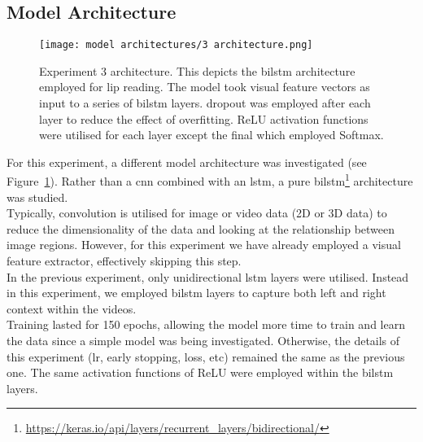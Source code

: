 \subsection{Model Architecture}
\begin{figure}
\centering
\texttt{[image: model architectures/3 architecture.png]}
\caption[Experiment 3 architecture]{Experiment 3 architecture. This depicts the \acrshort{bilstm} architecture employed for lip reading. The model took visual feature vectors as input to a series of \acrshort{bilstm} layers. \Gls{dropout} was employed after each layer to reduce the effect of \gls{overfitting}. ReLU activation functions were utilised for each layer except the final which employed Softmax.}
\label{fig:3 architecture}
\end{figure}
For this experiment, a different model architecture was investigated (see Figure~\ref{fig:3 architecture}). Rather than a \acrshort{cnn} combined with an \acrshort{lstm}, a pure \acrshort{bilstm}\footnote{\url{https://keras.io/api/layers/recurrent_layers/bidirectional/}} architecture was studied.\\
Typically, convolution is utilised for image or video data (2D or 3D data) to reduce the dimensionality of the data and looking at the relationship between image regions. However, for this experiment we have already employed a visual feature extractor, effectively skipping this step.\\
In the previous experiment, only unidirectional \acrshort{lstm} layers were utilised. Instead in this experiment, we employed \acrshort{bilstm} layers to capture both left and right context within the videos.\\
Training lasted for 150 epochs, allowing the model more time to train and learn the data since a simple model was being investigated. Otherwise, the details of this experiment (\acrshort{lr}, early stopping, loss, etc) remained the same as the previous one. The same activation functions of ReLU were employed within the \acrshort{bilstm} layers.

